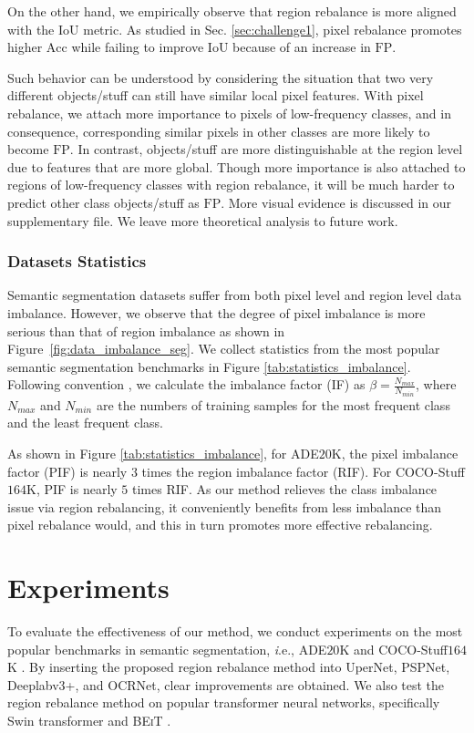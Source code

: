 \documentclass[final]{cvpr}
\begin{document}
On the other hand, we empirically observe that region rebalance is more aligned with the $\mathrm{IoU}$ metric. As studied in Sec. \ref{sec:challenge1}, pixel rebalance promotes higher $\mathrm{Acc}$ while failing to improve $\mathrm{IoU}$ because of an increase in $\mathrm{FP}$. 

Such behavior can be understood by considering the situation that two very different objects/stuff can still have similar local pixel features. With pixel rebalance, we attach more importance to pixels of low-frequency classes, and in consequence, corresponding similar pixels in other classes are more likely to become $\mathrm{FP}$. In contrast, objects/stuff are more distinguishable at the region level due to features that are more global. Though more importance is also attached to regions of low-frequency classes with region rebalance, it will be much harder to predict other class objects/stuff as $\mathrm{FP}$. More visual evidence is discussed in our supplementary file. We leave more theoretical analysis to future work.


\vspace{-0.12in}
\subsubsection{Datasets Statistics}
\label{sec:datasets_stats}
Semantic segmentation datasets suffer from both pixel level and region level data imbalance. However, we observe that the degree of pixel imbalance is more serious than that of region imbalance as shown in Figure~\ref{fig:data_imbalance_seg}. We collect statistics from the most popular semantic segmentation benchmarks in Figure \ref{tab:statistics_imbalance}. Following convention \cite{cb-focal,liu2019large}, we calculate the imbalance factor (IF) as $\beta= \frac{N_{max}}{N_{min}}$, where
$N_{max}$ and $N_{min}$ are the numbers of training samples for the most frequent class and the least frequent class.


As shown in Figure \ref{tab:statistics_imbalance}, for ADE$20$K, the pixel imbalance factor (PIF) is nearly $3$ times the region imbalance factor (RIF). For COCO-Stuff$164$K, PIF is nearly $5$ times RIF. 
As our method relieves the class imbalance issue via region rebalancing, it conveniently benefits from less imbalance than pixel rebalance would, and this in turn promotes more effective rebalancing.


\section{Experiments}
To evaluate the effectiveness of our method, we conduct experiments on the most popular benchmarks in semantic segmentation, {\textit i.e.}, ADE$20$K \cite{zhou2017scene} and COCO-Stuff$164$K \cite{caesar2018coco}. By inserting the proposed region rebalance method into UperNet, PSPNet, Deeplabv$3$+, and OCRNet, clear improvements are obtained. We also test the region rebalance method on popular transformer neural networks, specifically Swin transformer \cite{liu2021swin} and \textsc{BEiT} \cite{bao2021beit}.   
\end{document}

